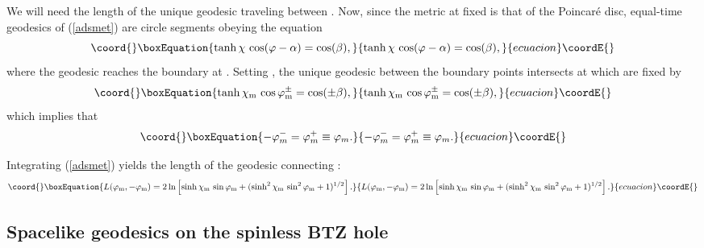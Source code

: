 \documentclass[a4paper,12pt]{article}
\begin{document}
We will need the length of the unique geodesic traveling between
\coordHE{}. Now, since the metric at
fixed \myHighlight{$\tau$}\coordHE{} is that of the Poincar\'e disc, equal-time geodesics of
(\ref{adsmet}) are circle segments obeying the equation
\begin{equation}\coord{}\boxEquation{ 
\tanh\chi \, \cos(\varphi - \alpha) = \cos(\beta),
\label{geodeq} 
}{ 
\tanh\chi \, \cos(\varphi - \alpha) = \cos(\beta),
}{ecuacion}\coordE{}\end{equation} 
where the geodesic reaches the \myHighlight{$\chi = \infty$}\coordHE{} boundary at \myHighlight{$\varphi =
\alpha \pm \beta$}\coordHE{}. Setting \coordHE{}, the unique geodesic between
the boundary points \myHighlight{$(\tau,\pm \beta)$}\coordHE{}
intersects \coordHE{} at \coordHE{} which are fixed by
\begin{equation}\coord{}\boxEquation{ 
\tanh\chi_{{\rm m}} \, \cos\varphi_{{\rm m}}^{\pm} = \cos(\pm\beta),
\label{phimax} 
}{ 
\tanh\chi_{{\rm m}} \, \cos\varphi_{{\rm m}}^{\pm} = \cos(\pm\beta),
}{ecuacion}\coordE{}\end{equation} 
which implies that
\begin{equation}\coord{}\boxEquation{ 
-\varphi_m^- = \varphi_m^+ \equiv \varphi_m.
}{ 
-\varphi_m^- = \varphi_m^+ \equiv \varphi_m.
}{ecuacion}\coordE{}\end{equation} 

Integrating (\ref{adsmet}) 
yields the length of the geodesic connecting \coordHE{}:
\begin{equation}\coord{}\boxEquation{ 
L(\varphi_{{\rm m}},-\varphi_{{\rm m}}) = 2 \ln\left[ \sinh\chi_{{\rm m}} \,
\sin\varphi_{{\rm m}} + (\sinh^2\chi_{{\rm m}} \, \sin^2\varphi_{{\rm
m}} + 1)^{1/2} \right]. \label{length1}
}{ 
L(\varphi_{{\rm m}},-\varphi_{{\rm m}}) = 2 \ln\left[ \sinh\chi_{{\rm m}} \,
\sin\varphi_{{\rm m}} + (\sinh^2\chi_{{\rm m}} \, \sin^2\varphi_{{\rm
m}} + 1)^{1/2} \right]. }{ecuacion}\coordE{}\end{equation} 
%

\subsection{Spacelike geodesics on the spinless BTZ hole}
\label{spin0BTZ}
\end{document}
